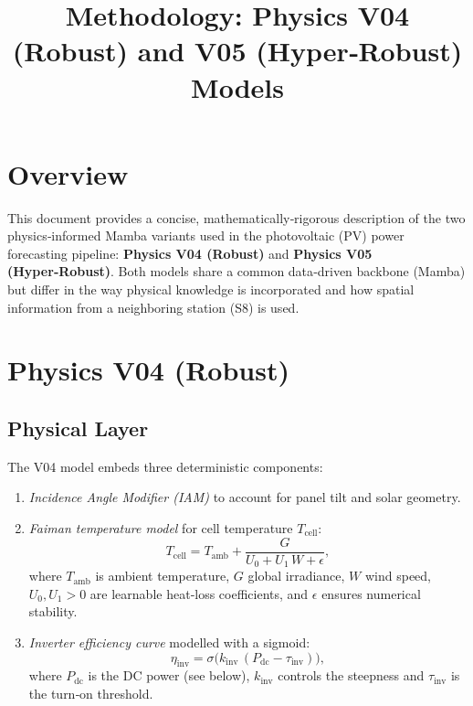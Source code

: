 \documentclass{article}
\title{Methodology: Physics V04 (Robust) and V05 (Hyper‑Robust) Models}
\author{}
\date{}
\begin{document}
\maketitle

\section{Overview}
This document provides a concise, mathematically‑rigorous description of the two physics‑informed Mamba variants used in the photovoltaic (PV) power forecasting pipeline: \textbf{Physics V04 (Robust)} and \textbf{Physics V05 (Hyper‑Robust)}. Both models share a common data‑driven backbone (Mamba) but differ in the way physical knowledge is incorporated and how spatial information from a neighboring station (S8) is used.

\section{Physics V04 (Robust)}

\subsection{Physical Layer}
The V04 model embeds three deterministic components:
\begin{enumerate}
  \item \textit{Incidence Angle Modifier (IAM)} to account for panel tilt and solar geometry.
  \item \textit{Faiman temperature model} for cell temperature $T_{\text{cell}}$:
  \begin{equation}
    T_{\text{cell}} = T_{\text{amb}} + \frac{G}{U_{0} + U_{1}\,W + \epsilon},
    \label{eq:faiman}
  \end{equation}
  where $T_{\text{amb}}$ is ambient temperature, $G$ global irradiance, $W$ wind speed, $U_{0},U_{1}>0$ are learnable heat‑loss coefficients, and $\epsilon$ ensures numerical stability.
  \item \textit{Inverter efficiency curve} modelled with a sigmoid:
  \begin{equation}
    \eta_{\text{inv}} = \sigma\big(k_{\text{inv}}\,(P_{\text{dc}} - \tau_{\text{inv}})\big),
    \label{eq:inv}
  \end{equation}
  where $P_{\text{dc}}$ is the DC power (see below), $k_{\text{inv}}$ controls the steepness and $\tau_{\text{inv}}$ is the turn‑on threshold.
\end{enumerate}
\end{document}
